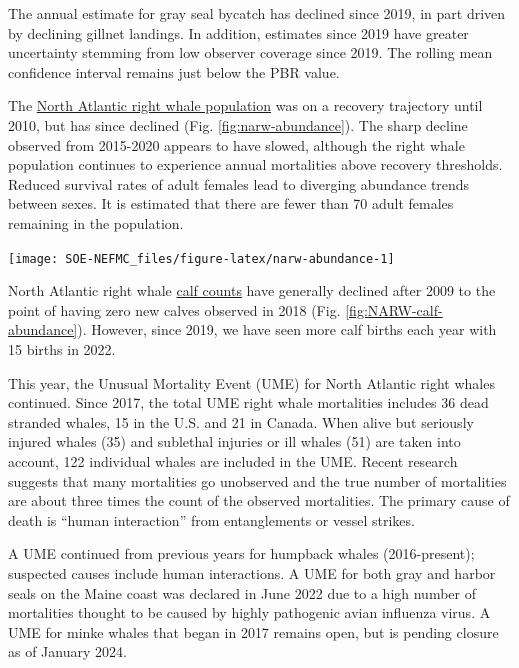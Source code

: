\documentclass[
  10pt,
]{article}
\let\origfigure\figure
\let\endorigfigure\endfigure
\renewenvironment{figure}[1][2] {
    \expandafter\origfigure\expandafter[H]
} {
    \endorigfigure
}
\begin{document}
The annual estimate for gray seal bycatch has declined since 2019, in part driven by declining gillnet landings. In addition, estimates since 2019 have greater uncertainty stemming from low observer coverage since 2019. The rolling mean confidence interval remains just below the PBR value.

The \href{https://noaa-edab.github.io/catalog/right-whale-abundance.html}{North Atlantic right whale population} was on a recovery trajectory until 2010, but has since declined (Fig. \ref{fig:narw-abundance}). The sharp decline observed from 2015-2020 appears to have slowed, although the right whale population continues to experience annual mortalities above recovery thresholds. Reduced survival rates of adult females lead to diverging abundance trends between sexes. It is estimated that there are fewer than 70 adult females remaining in the population.

\begin{figure}

{\centering \texttt{[image: SOE-NEFMC\_files/figure-latex/narw-abundance-1]} 

}

\caption{Estimated North Atlanic right whale abundance on the Northeast Shelf.}\label{fig:narw-abundance}
\end{figure}

North Atlantic right whale \href{https://noaa-edab.github.io/catalog/right-whale-abundance.html}{calf counts} have generally declined after 2009 to the point of having zero new calves observed in 2018 (Fig. \ref{fig:NARW-calf-abundance}). However, since 2019, we have seen more calf births each year with 15 births in 2022.

This year, the Unusual Mortality Event (UME) for North Atlantic right whales continued. Since 2017, the total UME right whale mortalities includes 36 dead stranded whales, 15 in the U.S. and 21 in Canada. When alive but seriously injured whales (35) and sublethal injuries or ill whales (51) are taken into account, 122 individual whales are included in the UME. Recent research suggests that many mortalities go unobserved and the true number of mortalities are about three times the count of the observed mortalities. The primary cause of death is ``human interaction'' from entanglements or vessel strikes.

A UME continued from previous years for humpback whales (2016-present); suspected causes include human interactions. A UME for both gray and harbor seals on the Maine coast was declared in June 2022 due to a high number of mortalities thought to be caused by highly pathogenic avian influenza virus. A UME for minke whales that began in 2017 remains open, but is pending closure as of January 2024.
\end{document}
